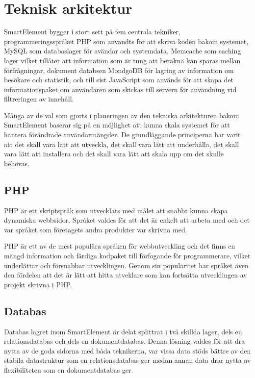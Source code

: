 \section{Teknisk arkitektur}

SmartElement bygger i stort sett på fem centrala tekniker, programmeringsspråket PHP som användts för att skriva koden bakom systemet, MySQL som databaslager för avändar och systemdata, Memcache som caching lager vilket tillåter att information som är tung att beräkna kan sparas mellan förfrågningar, dokument databsen MondgoDB för lagring av information om besökare och statistik, och till sist JavaScript som används för att skapa det informationspaket om användaren som skickas till servern för användning vid filtreringen av innehåll.

Många av de val som gjorts i planeringen av den tekniska arkitekturen bakom SmartElement baserar sig på en möjlighet att kunna skala systemet för att hantera förändrade användarmängder. De grundläggande principerna har varit att det skall vara lätt att utveckla, det skall vara lätt att underhålla, det skall vara lätt att installera och det skall vara lätt att skala upp om det skulle behövas.

\subsection{PHP}

PHP är ett skriptspråk som utvecklats med målet att snabbt kunna skapa dynamiska webbsidor. \citep{phpmanual} Språket valdes för att det är enkelt att arbeta med och det var språket som företagets andra produkter var skrivna med.

PHP är ett av de mest populära språken för webbutveckling \citep{tiobe} och det finns en mängd information och färdiga kodpaket till förfogande för programmerare, vilket underlättar och försnabbar utvecklingen. Genom sin popularitet har språket även den fördelen att det är lätt att hitta utveklare som kan fortsätta utvecklingen av projekt skrivna i PHP.

\subsection{Databas}

Databas lagret inom SmartElement är delat splittrat i två skillda lager, dels en relationsdatabas och dels en dokumentdatabas. Denna lösning valdes för att dra nytta av de goda sidorna med båda teknikerna, var vissa data stöds bättre av den stabila datastruktur som en relationsdatabas ger medan annan data drar nytta av flexibiliteten som en dokumentdatabas ger.

